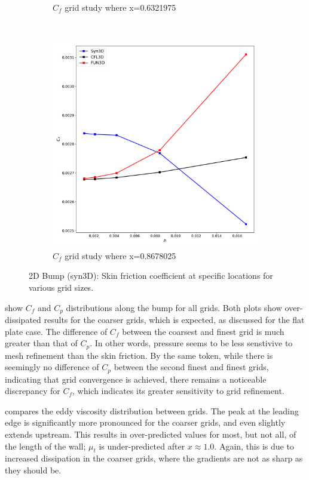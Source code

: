 \begin{figure}[ht!]
\begin{subfigure}{.45\textwidth}
  \caption{$C_f$ grid study where x=0.6321975}
\end{subfigure}
\\
\begin{subfigure}{.45\textwidth}
  \centering
  \includegraphics[width=1.0\textwidth]{figs/2dbump/Cf08678025GridStudy.pdf}
  \caption{$C_f$ grid study where x=0.8678025}
\end{subfigure}%
\caption{2D Bump (syn3D): Skin friction coefficient at specific locations for various grid sizes.}
\label{fig:syn2dbumpcflocstudy}
\end{figure}

 show $C_f$ and $C_p$ distributions along the bump for all grids. Both plots show over-dissipated results for the coarser grids, which is expected, as discussed for the flat plate case. The difference of $C_f$ between the coarsest and finest grid is much greater than that of $C_p$. In other words, pressure seems to be less senstivive to mesh refinement than the skin friction. By the same token, while there is seemingly no difference of $C_p$ between the second finest and finest grids, indicating that grid convergence is achieved, there remains a noticeable discrepancy for $C_f$, which indicates its greater sensitivity to grid refinement.

 compares the eddy viscosity distribution between grids. The peak at the leading edge is significantly more pronounced for the coarser grids, and even slightly extends upstream. This results in over-predicted values for most, but not all, of the length of the wall; $\mu_t$ is under-predicted after $x\approx1.0$. Again, this is due to increased dissipation in the coarser grids, where the gradients are not as sharp as they should be.

